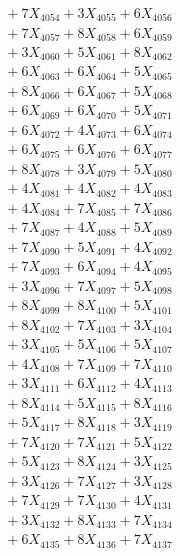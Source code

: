 \documentclass[a4paper,10pt]{article}
\begin{document}
{\begin{align}
&\;  + 7 X_{4054} + 3 X_{4055} + 6 X_{4056} \\[0.3ex]
&\;  + 7 X_{4057} + 8 X_{4058} + 6 X_{4059} \\[0.5ex]\allowbreak
&\;  + 3 X_{4060} + 5 X_{4061} + 8 X_{4062} \\[0.3ex]
&\;  + 6 X_{4063} + 6 X_{4064} + 5 X_{4065} \\[0.3ex]
&\;  + 8 X_{4066} + 6 X_{4067} + 5 X_{4068} \\[0.3ex]
&\;  + 6 X_{4069} + 6 X_{4070} + 5 X_{4071} \\[0.3ex]
&\;  + 6 X_{4072} + 4 X_{4073} + 6 X_{4074} \\[0.3ex]
&\;  + 6 X_{4075} + 6 X_{4076} + 6 X_{4077} \\[0.3ex]
&\;  + 8 X_{4078} + 3 X_{4079} + 5 X_{4080} \\[0.3ex]
&\;  + 4 X_{4081} + 4 X_{4082} + 4 X_{4083} \\[0.3ex]
&\;  + 4 X_{4084} + 7 X_{4085} + 7 X_{4086} \\[0.3ex]
&\;  + 7 X_{4087} + 4 X_{4088} + 5 X_{4089} \\[0.5ex]\allowbreak
&\;  + 7 X_{4090} + 5 X_{4091} + 4 X_{4092} \\[0.3ex]
&\;  + 7 X_{4093} + 6 X_{4094} + 4 X_{4095} \\[0.3ex]
&\;  + 3 X_{4096} + 7 X_{4097} + 5 X_{4098} \\[0.3ex]
&\;  + 8 X_{4099} + 8 X_{4100} + 5 X_{4101} \\[0.3ex]
&\;  + 8 X_{4102} + 7 X_{4103} + 3 X_{4104} \\[0.3ex]
&\;  + 3 X_{4105} + 5 X_{4106} + 5 X_{4107} \\[0.3ex]
&\;  + 4 X_{4108} + 7 X_{4109} + 7 X_{4110} \\[0.3ex]
&\;  + 3 X_{4111} + 6 X_{4112} + 4 X_{4113} \\[0.3ex]
&\;  + 8 X_{4114} + 5 X_{4115} + 8 X_{4116} \\[0.3ex]
&\;  + 5 X_{4117} + 8 X_{4118} + 3 X_{4119} \\[0.5ex]\allowbreak
&\;  + 7 X_{4120} + 7 X_{4121} + 5 X_{4122} \\[0.3ex]
&\;  + 5 X_{4123} + 8 X_{4124} + 3 X_{4125} \\[0.3ex]
&\;  + 3 X_{4126} + 7 X_{4127} + 3 X_{4128} \\[0.3ex]
&\;  + 7 X_{4129} + 7 X_{4130} + 4 X_{4131} \\[0.3ex]
&\;  + 3 X_{4132} + 8 X_{4133} + 7 X_{4134} \\[0.3ex]
&\;  + 6 X_{4135} + 8 X_{4136} + 7 X_{4137} \\[0.3ex]

\end{align}}
\end{document}
